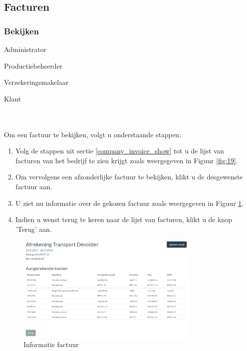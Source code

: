 \documentclass[11pt,openany]{article}
\newcommand{\cmark}{\ding{51}}%
\newcommand{\done}{\rlap{$\square$}{\raisebox{2pt}{\large\hspace{1pt}\cmark}}%
	\hspace{-2.5pt}}
\begin{document}
\newpage
\subsection{Facturen}
\subsubsection{Bekijken}
\label{invoice_show}
\begin{todolist}
	\item[\done] Administrator
	\item[\done] Productiebeheerder
	\item[\done] Verzekeringsmakelaar
	\item[\done] Klant 
\end{todolist}
\\
\\
Om een factuur te bekijken, volgt u onderstaande stappen:
\begin{enumerate}
	\item Volg de stappen uit sectie \ref{company_invoice_show} tot u de lijst van facturen van het bedrijf te zien krijgt zoals weergegeven in Figuur \ref{fig:19}.
	\item Om vervolgens een afzonderlijke factuur te bekijken, klikt u de desgewenste factuur aan.
	\item U ziet nu informatie over de gekozen factuur zoals weergegeven in Figuur \ref{fig:46}. 
	\item Indien u wenst terug te keren naar de lijst van facturen, klikt u de knop 'Terug' aan.
	
\end{enumerate}
\begin{figure}
	\centering
	\includegraphics[width=0.8\textwidth]{img/fig46.png}
	\caption{Informatie factuur} 
	\label{fig:46} 
\end{figure}

\newpage
\end{document}
